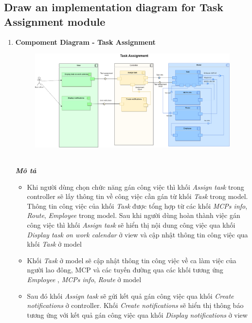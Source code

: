 \documentclass[a4paper]{article}
\begin{document}
\subsection{Draw an implementation diagram for Task Assignment module}
\begin{enumerate}
    \item \textbf{Compoment Diagram - Task Assignment}
        \begin{figure}[!h]
    \begin{center}
      \includegraphics[width=6in]{Image/task_mn_arch.png}
    \end{center}
\end{figure} \\
\textbf{\textit{Mô tả}}
\begin{itemize}
\item  Khi người dùng chọn chức năng gán công việc thì khối \textit{Assign task} trong controller sẽ lấy thông tin về công việc cần gán từ khối \textit{Task} trong model. Thông tin công việc của khối \textit{Task} được tổng hợp từ các khối \textit {MCPs info},  \textit{Route},  \textit{Employee} trong model. Sau khi người dùng hoàn thành việc gán công việc thì khối \textit{Assign task} sẽ hiển thị nội dung công việc qua khối \textit{Display task on work calendar} ở view và cập nhật thông tin công việc qua khối \textit{Task} ở model
\item  Khối  \textit{Task} ở model sẽ cập nhật thông tin công việc về ca làm việc của người lao đông, MCP và các tuyến đường qua các khối tương ứng \textit{Employee },   \textit{MCPs info}, \textit{Route} ở model 
\item  Sau đó khối \textit{Assign task} sẽ gửi kết quả gán công việc qua khối \textit{Create notifications} ở controller. Khối \textit{Create notifications} sẽ hiển thị thông báo tương ứng với kết quả gán công việc qua khối \textit{Display notifications} ở view
\end{itemize}

\end{enumerate}
\end{document}
